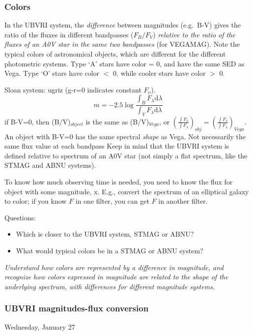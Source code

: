 \documentclass[12pt]{article}
\begin{document}
\subsubsection{Colors}
In the UBVRI system, the \emph{difference} between magnitudes
(e.g.\ B-V) gives the ratio of the fluxes in different bandpasses
($F_{B}/F_{V}$)
\emph{relative to the ratio of the fluxes of
an A0V star in the same two bandpasses} (for VEGAMAG).
Note the typical colors of astronomical objects,
which are different for the different photometric systems.
Type `A' stars have color =  0, and have the same SED as Vega.
Type `O' stars have color $<$ 0,
while cooler stars have color $>$ 0.

Sloan system: ugriz (g-r=0 indicates constant $F_{\nu}$).
$$    m = -2.5\log\frac{\int_B F_{\lambda}\textrm{d}\lambda}
    {\int_V F_{\lambda}\textrm{d}\lambda} $$
if B-V=0, then (B/V)$_{object}$ is the same as (B/V)$_{Vega}$,
or $\left(\frac{\int F_{\nu}}{\int F_{\lambda}}\right)_{obj} =
    \left(\frac{\int F_{\nu}}{\int F_{\lambda}}\right)_{Vega} $.
An object with B-V=0 has the same spectral \emph{shape} as Vega.
Not necessarily the same flux value at each bandpass
Keep in mind that the UBVRI system is defined relative to spectrum of
an A0V star (not simply a flat spectrum, like the STMAG and ABNU
systems).

To know how much observing time is needed, you need to know the flux
for object with some magnitude, x.
E.g., convert the spectrum of an elliptical galaxy to color;
if you know $F$ in one filter, you can get $F$ in another filter.

Questions:
\begin{itemize}
    \item Which is closer to the UBVRI system, STMAG or ABNU?
    \item What would typical colors be in a STMAG or ABNU system?
\end{itemize}

\textcolor{om}{\emph{Understand how colors are represented by a difference in
magnitude, and recognize how colors expressed in magnitude are related
to the shape of the underlying spectrum, with differences for
different magnitude systems.}}

\subsubsection{UBVRI magnitudes-flux conversion}
\textcolor{date}{Wednesday, January 27}
\end{document}
